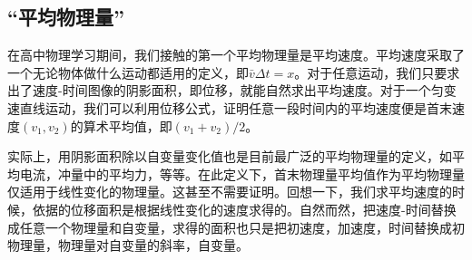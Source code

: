\subsection{“平均物理量”}
在高中物理学习期间，我们接触的第一个平均物理量是平均速度。平均速度采取了一个无论物体做什么运动都适用的定义，即$\bar v\Delta t=x$。对于任意运动，我们只要求出了速度-时间图像的阴影面积，即位移，就能自然求出平均速度。对于一个匀变速直线运动，我们可以利用位移公式，证明任意一段时间内的平均速度便是首末速度$(v_1,v_2)$的算术平均值，即$(v_1+v_2)/2$。

实际上，用阴影面积除以自变量变化值也是目前最广泛的平均物理量的定义，如平均电流，冲量中的平均力，等等。在此定义下，首末物理量平均值作为平均物理量仅适用于线性变化的物理量。这甚至不需要证明。回想一下，我们求平均速度的时候，依据的位移面积是根据线性变化的速度求得的。自然而然，把速度-时间替换成任意一个物理量和自变量，求得的面积也只是把初速度，加速度，时间替换成初物理量，物理量对自变量的斜率，自变量。
